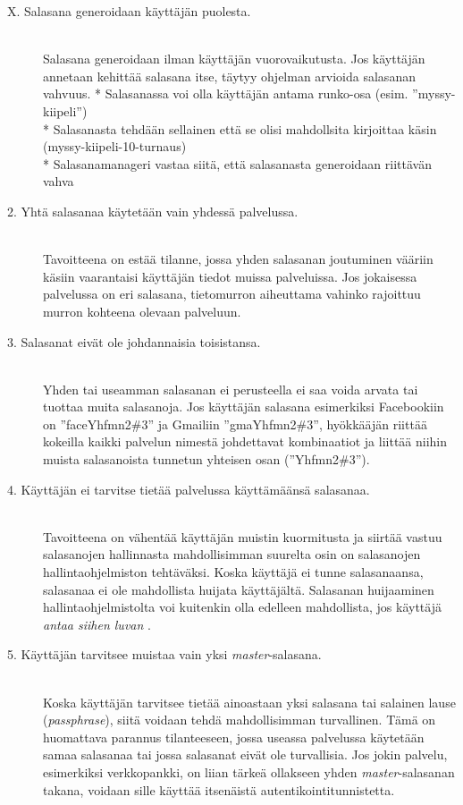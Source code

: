 \documentclass[english,gradu]{tktltiki}
\begin{document}
\begin{description}
           \item[X. Salasana generoidaan käyttäjän puolesta.] \hfill \\
           Salasana generoidaan ilman käyttäjän vuorovaikutusta.
           Jos käyttäjän annetaan kehittää salasana itse, täytyy ohjelman arvioida salasanan vahvuus.
            * Salasanassa voi olla käyttäjän antama runko-osa (esim. ''myssy-kiipeli'') \\
            * Salasanasta tehdään sellainen että se olisi mahdollsita kirjoittaa käsin (myssy-kiipeli-10-turnaus) \\
            * Salasanamanageri vastaa siitä, että salasanasta generoidaan riittävän vahva \\

           \item[2. Yhtä salasanaa käytetään vain yhdessä palvelussa.] \hfill \\
            Tavoitteena on estää tilanne, jossa yhden salasanan joutuminen vääriin käsiin vaarantaisi käyttäjän tiedot
            muissa palveluissa. Jos jokaisessa palvelussa on eri salasana, tietomurron aiheuttama vahinko rajoittuu
            murron kohteena olevaan palveluun.

           \item[3. Salasanat eivät ole johdannaisia toisistansa.] \hfill \\
             Yhden tai useamman salasanan ei perusteella ei saa voida arvata tai tuottaa muita salasanoja. Jos käyttäjän
             salasana esimerkiksi Facebookiin on ''faceYhfmn2\#3'' ja Gmailiin ''gmaYhfmn2\#3'', hyökkääjän riittää
             kokeilla kaikki palvelun nimestä johdettavat kombinaatiot ja liittää niihin muista salasanoista tunnetun
             yhteisen osan (''Yhfmn2\#3'').

           \item[4. Käyttäjän ei tarvitse tietää palvelussa käyttämäänsä salasanaa.] \hfill \\
             Tavoitteena on vähentää käyttäjän muistin kuormitusta ja siirtää vastuu salasanojen hallinnasta
             mahdollisimman suurelta osin on salasanojen hallintaohjelmiston tehtäväksi.
             Koska käyttäjä ei tunne salasanaansa, salasanaa ei ole mahdollista huijata käyttäjältä.
             Salasanan huijaaminen hallintaohjelmistolta voi kuitenkin olla edelleen mahdollista, jos käyttäjä
             \emph{antaa siihen luvan} \cite{why_phishing_works_06}.

           \item[5. Käyttäjän tarvitsee muistaa vain yksi \emph{master}-salasana.] \hfill \\
             Koska käyttäjän tarvitsee tietää ainoastaan yksi salasana tai salainen lause (\emph{passphrase}), siitä
             voidaan tehdä mahdollisimman turvallinen. Tämä on huomattava parannus tilanteeseen, jossa useassa palvelussa
             käytetään samaa salasanaa tai jossa salasanat eivät ole turvallisia. Jos jokin palvelu, esimerkiksi
             verkkopankki, on liian tärkeä ollakseen yhden \emph{master}-salasanan takana, voidaan sille käyttää
             itsenäistä autentikointitunnistetta.


\end{description}
\end{document}
